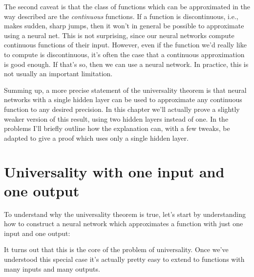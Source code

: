 \documentclass[a4paper,twoside,10pt]{book}
\begin{document}
The second caveat is that the class of functions which can be approximated in the way described are the \textit{continuous} functions. If a function is discontinuous, i.e., makes sudden, sharp jumps, then it won't in general be possible to approximate using a neural net. This is not surprising, since our neural networks compute continuous functions of their input. However, even if the function we'd really like to compute is discontinuous, it's often the case that a continuous approximation is good enough. If that's so, then we can use a neural network. In practice, this is not usually an important limitation.

Summing up, a more precise statement of the universality theorem is that neural networks with a single hidden layer can be used to approximate any continuous function to any desired precision. In this chapter we'll actually prove a slightly weaker version of this result, using two hidden layers instead of one. In the problems I'll briefly outline how the explanation can, with a few tweaks, be adapted to give a proof which uses only a single hidden layer.

\section{Universality with one input and one output}
To understand why the universality theorem is true, let's start by understanding how to construct a neural network which approximates a function with just one input and one output:
\begin{center} 
\end{center}
It turns out that this is the core of the problem of universality. Once we've understood this special case it's actually pretty easy to extend to functions with many inputs and many outputs.
\end{document}
